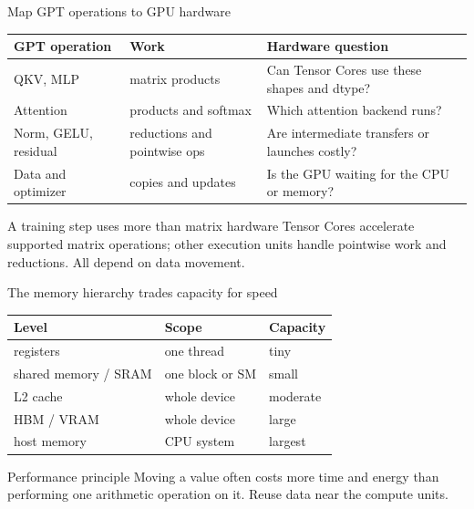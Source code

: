 \documentclass[handout]{beamer}
\begin{document}
\begin{frame}{Map GPT operations to GPU hardware}
  \small
  \begin{tabular}{@{}>{\raggedright\arraybackslash}p{.27\linewidth}>{\raggedright\arraybackslash}p{.27\linewidth}>{\raggedright\arraybackslash}p{.35\linewidth}@{}}
    \toprule
    GPT operation & Work & Hardware question \\
    \midrule
    QKV, MLP & matrix products & Can Tensor Cores use these shapes and dtype? \\[5pt]
    Attention & products and softmax & Which attention backend runs? \\[5pt]
    Norm, GELU, residual & reductions and pointwise ops & Are intermediate transfers or launches costly? \\[5pt]
    Data and optimizer & copies and updates & Is the GPU waiting for the CPU or memory? \\
    \bottomrule
  \end{tabular}
  \vfill
  \begin{block}{A training step uses more than matrix hardware}
    Tensor Cores accelerate supported matrix operations; other execution units handle pointwise work and reductions. All depend on data movement.
  \end{block}
\end{frame}

\begin{frame}{The memory hierarchy trades capacity for speed}
  \centering\small
  \begin{tabular}{@{}>{\raggedright\arraybackslash}p{.36\linewidth}>{\raggedright\arraybackslash}p{.28\linewidth}>{\raggedright\arraybackslash}p{.22\linewidth}@{}}
    \toprule
    Level & Scope & Capacity \\
    \midrule
    registers & one thread & tiny \\
    shared memory / SRAM & one block or SM & small \\
    L2 cache & whole device & moderate \\
    HBM / VRAM & whole device & large \\
    host memory & CPU system & largest \\
    \bottomrule
  \end{tabular}
  \vfill
  \begin{alertblock}{Performance principle}
    Moving a value often costs more time and energy than performing one arithmetic operation on it. Reuse data near the compute units.
  \end{alertblock}
\end{frame}
\end{document}
